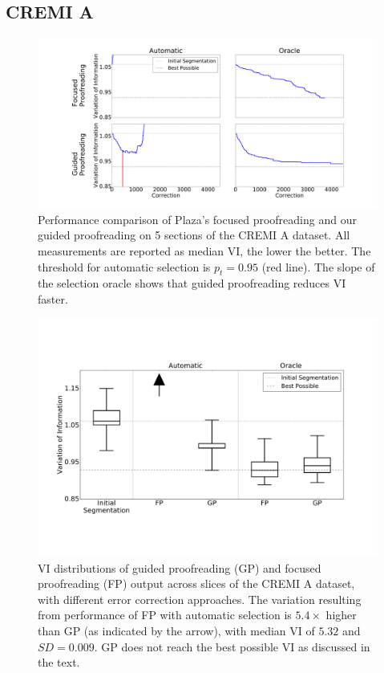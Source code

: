 \subsection{CREMI A}

\begin{figure}[t]
\centering
\includegraphics[width=\linewidth]{gfx/cremiAtrails.pdf}
\caption{Performance comparison of Plaza's focused proofreading and our guided proofreading on 5 sections of the CREMI A dataset. All measurements are reported as median VI, the lower the better. The threshold for automatic selection is $p_t=0.95$ (red line). The slope of the selection oracle shows that guided proofreading reduces VI faster.}
\label{fig:cremiAtrails}
\end{figure}

\begin{figure}[t]
\centering
\includegraphics[width=\linewidth]{gfx/cremiAboxplot.pdf}
\caption{VI distributions of guided proofreading (GP) and focused proofreading (FP) output across slices of the CREMI A dataset, with different error correction approaches. The variation resulting from performance of FP with automatic selection is $5.4\times$ higher than GP (as indicated by the arrow), with median VI of $5.32$ and $SD=0.009$. GP does not reach the best possible VI as discussed in the text.}
\label{fig:cremiAboxplot}
\end{figure}

